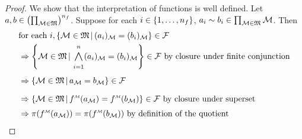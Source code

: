 \begin{proof}
    We show that the interpretation of functions is well defined.
    Let $a, b \in \left(\prod_{\mathcal{M} \in \mathfrak{M}}\right)^{n_f}$.
    Suppose for each $i \in \left\{1,\dots,n_f\right\}$, 
    $a_i \sim b_i \in \prod_{\mathcal{M} \in \mathfrak{M}} \mathcal{M}$.
    Then 
    \begin{align*}
        &\text{for each } i, 
        \set{\MM \in \f{M} \st (a_i)_\MM = (b_i)_\MM} \in \FF \\
        &\implies
        \set{\MM \in \f{M} \st \bigand{i = 1}{n} (a_i)_\MM = (b_i)_\MM} \in \FF
        \text{ by closure under finite conjunction}\\
        &\implies
        \set{\MM \in \f{M} \st a_\MM = b_\MM} \in \FF\\
        &\implies
        \set{\MM \in \f{M} \st 
            \modintp{\MM}{f}(a_\MM) = \modintp{\MM}{f}(b_\MM)} \in \FF
        \text{ by closure under superset}\\
        &\implies \pi(\mmintp{f}(a_\MM)) = \pi(\mmintp{f}(b_\MM))
        \text{ by definition of the quotient}
    \end{align*}


\end{proof}
